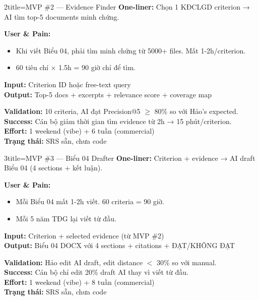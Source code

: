 \documentclass[11pt,a4paper]{article}
\begin{document}
\begin{mvpbox}{2}{title=MVP \#2 — Evidence Finder}
\textbf{One-liner:} Chọn 1 KĐCLGD criterion → AI tìm top-5 documents minh chứng.

\textbf{User \& Pain:}
\begin{itemize}
\item Khi viết Biểu 04, phải tìm minh chứng từ 5000+ files. Mất 1-2h/criterion.
\item 60 tiêu chí × 1.5h = 90 giờ chỉ để tìm.
\end{itemize}

\textbf{Input:} Criterion ID hoặc free-text query\\
\textbf{Output:} Top-5 docs + excerpts + relevance score + coverage map

\textbf{Validation:} 10 criteria, AI đạt Precision@5 $\geq$ 80\% so với Hảo's expected.\\
\textbf{Success:} Cán bộ giảm thời gian tìm evidence từ 2h → 15 phút/criterion.\\
\textbf{Effort:} 1 weekend (vibe) + 6 tuần (commercial)\\
\textbf{Trạng thái:} SRS sẵn, chưa code
\end{mvpbox}

\begin{mvpbox}{3}{title=MVP \#3 — Biểu 04 Drafter}
\textbf{One-liner:} Criterion + evidence → AI draft Biểu 04 (4 sections + kết luận).

\textbf{User \& Pain:}
\begin{itemize}
\item Mỗi Biểu 04 mất 1-2h viết. 60 criteria = 90 giờ.
\item Mỗi 5 năm TĐG lại viết từ đầu.
\end{itemize}

\textbf{Input:} Criterion + selected evidence (từ MVP \#2)\\
\textbf{Output:} Biểu 04 DOCX với 4 sections + citations + ĐẠT/KHÔNG ĐẠT

\textbf{Validation:} Hảo edit AI draft, edit distance $<$ 30\% so với manual.\\
\textbf{Success:} Cán bộ chỉ edit 20\% draft AI thay vì viết từ đầu.\\
\textbf{Effort:} 1 weekend (vibe) + 8 tuần (commercial)\\
\textbf{Trạng thái:} SRS sẵn, chưa code
\end{mvpbox}
\end{document}
